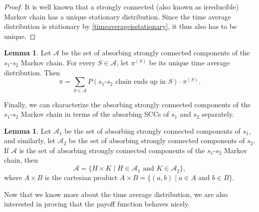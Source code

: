 \documentclass[11pt]{amsart}
\theoremstyle{definition}
\newtheorem{lemma}[theorem]{Lemma}
\theoremstyle{remark}
\begin{document}
\begin{proof}
  It is well known that a strongly connected (also known as irreducible) Markov chain has a unique stationary distribution. Since the time average distribution is stationary by \cref{timeaverageisstationary}, it thus also has to be unique.
\end{proof}

\begin{lemma}
  \label{timeaveragedistributiondecomposition}
  Let $\mathcal{A}$ be the set of absorbing strongly connected components of the $s_1$-$s_2$ Markov chain. For every $S \in \mathcal{A}$, let $\pi^{(S)}$ be its unique time average distribution. Then
  \begin{equation*}
    \pi = \sum_{S \in \mathcal{A}} P(\text{$s_1$-$s_2$ chain ends up in $S$}) \cdot \pi^{(S)}.
  \end{equation*}
\end{lemma}

Finally, we can characterize the absorbing strongly connected components of the $s_1$-$s_2$ Markov chain in terms of the absorbing SCCs of $s_1$ and $s_2$ separately.

\begin{lemma}
  \label{absorbingstronglyconnectedcomponentscartesianproduct}
  Let $\mathcal{A}_1$ be the set of absorbing strongly connected components of $s_1$, and similarly, let $\mathcal{A}_2$ be the set of absorbing strongly connected components of $s_2$. If $\mathcal{A}$ is the set of absorbing strongly connected components of the $s_1$-$s_2$ Markov chain, then 
  \begin{equation*}
    \mathcal{A} = \{H \times K \mid H \in \mathcal{A}_1 \text{ and } K \in \mathcal{A}_2\},
  \end{equation*}
  where $A \times B$ is the cartesian product $A \times B = \{(a, b) \mid a \in A \text{ and } b \in B\}$.
\end{lemma}

Now that we know more about the time average distribution, we are also interested in proving that the payoff function behaves nicely.
\end{document}
